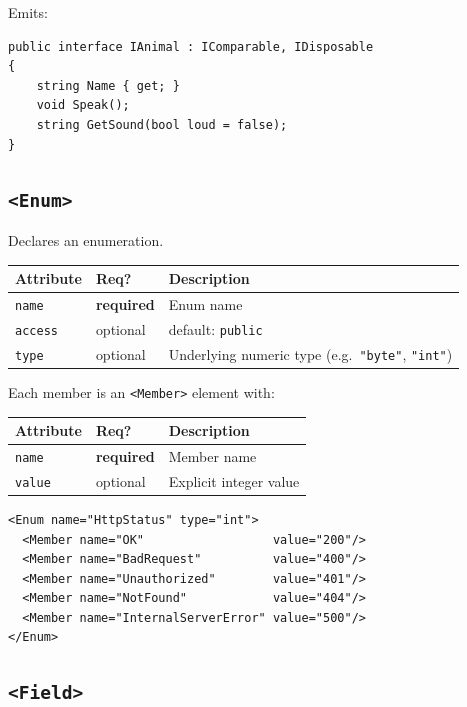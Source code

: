 \documentclass[11pt,a4paper]{article}
\newcommand{\el}[1]{\texttt{\textcolor{xoop-keyword}{<#1>}}}
\newcommand{\attr}[1]{\texttt{\textcolor{xoop-attr}{#1}}}
\newcommand{\val}[1]{\texttt{\textcolor{xoop-string}{"#1"}}}
\newcommand{\required}{\textcolor{xoop-red}{\textbf{required}}}
\newcommand{\optional}{\textcolor{xoop-green}{optional}}
\newcommand{\default}[1]{\textcolor{xoop-green}{default: \texttt{#1}}}
\begin{document}
Emits:
\begin{lstlisting}[style=csstyle, numbers=none]
public interface IAnimal : IComparable, IDisposable
{
    string Name { get; }
    void Speak();
    string GetSound(bool loud = false);
}
\end{lstlisting}

\subsection{\el{Enum}}

Declares an enumeration.

\begin{center}
\begin{tabularx}{\linewidth}{llX}
\toprule
Attribute & Req? & Description \\
\midrule
\attr{name}   & \required & Enum name \\
\attr{access} & \optional & \default{public} \\
\attr{type}   & \optional & Underlying numeric type (e.g.\ \val{byte}, \val{int}) \\
\bottomrule
\end{tabularx}
\end{center}

Each member is an \el{Member} element with:

\begin{center}
\begin{tabular}{lll}
\toprule
Attribute & Req? & Description \\
\midrule
\attr{name}  & \required & Member name \\
\attr{value} & \optional & Explicit integer value \\
\bottomrule
\end{tabular}
\end{center}

\begin{lstlisting}[caption={Enum with explicit values}]
<Enum name="HttpStatus" type="int">
  <Member name="OK"                  value="200"/>
  <Member name="BadRequest"          value="400"/>
  <Member name="Unauthorized"        value="401"/>
  <Member name="NotFound"            value="404"/>
  <Member name="InternalServerError" value="500"/>
</Enum>
\end{lstlisting}

\subsection{\el{Field}}
\end{document}
